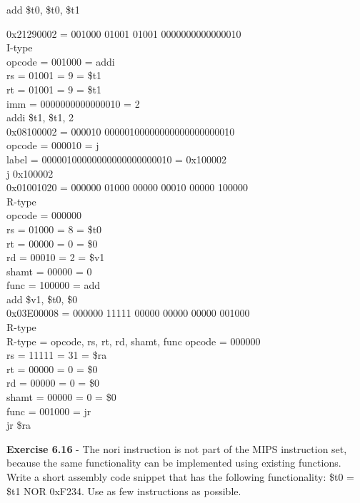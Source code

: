 \documentclass[12pt,a4paper]{report}
\begin{document}
\begin{normalsize}
add \$t0, \$t0, \$t1

0x21290002 = 001000 01001 01001 0000000000000010 \\
I-type \\
opcode = 001000 = addi \\
rs = 01001 = 9 = \$t1 \\
rt = 01001 = 9 = \$t1 \\
imm = 0000000000000010 = 2\\

addi \$t1, \$t1, 2 \\

0x08100002 = 000010 00000100000000000000000010 \\
opcode = 000010 = j \\
label = 00000100000000000000000010 = 0x100002 \\

j 0x100002 \\

0x01001020 = 000000 01000 00000 00010 00000 100000 \\
R-type \\
opcode = 000000 \\
rs = 01000 = 8 = \$t0 \\
rt = 00000 = 0 = \$0 \\
rd = 00010 = 2 = \$v1  \\
shamt = 00000 = 0 \\
func = 100000 = add \\

add \$v1, \$t0, \$0 \\

0x03E00008 = 000000 11111 00000 00000 00000 001000 \\
R-type \\
R-type = opcode, rs, rt, rd, shamt, func
opcode = 000000 \\
rs = 11111 = 31 = \$ra \\
rt = 00000 = 0 = \$0 \\
rd = 00000 = 0 = \$0 \\
shamt = 00000 = 0 = \$0 \\
func = 001000 = jr \\

jr \$ra \\

\medskip

\textbf{Exercise 6.16} - The nori instruction is not part of the MIPS instruction set, because the same functionality can be implemented using existing functions. Write a short assembly code snippet that has the following functionality: \$t0 = \$t1 NOR 0xF234. Use as few instructions as possible. \\




\end{normalsize}
\end{document}
